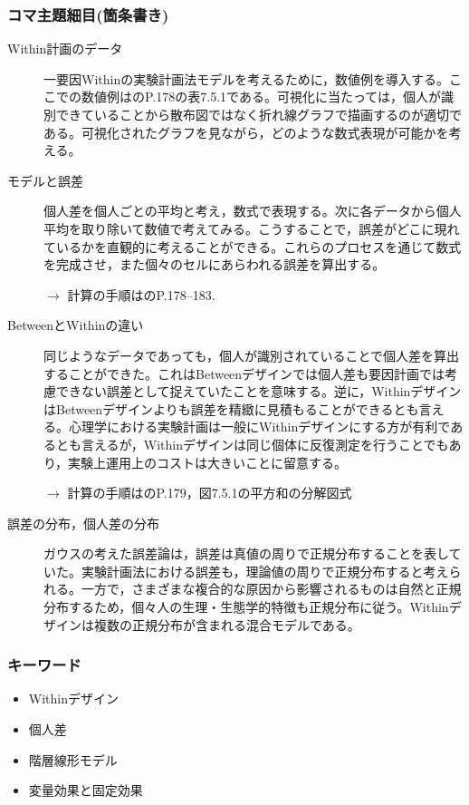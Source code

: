 \subsubsection{コマ主題細目(箇条書き)}
\begin{description}
\item[Within計画のデータ] 一要因Withinの実験計画法モデルを考えるために，数値例を導入する。ここでの数値例は\citet{Yamada2004}のP.178の表7.5.1である。可視化に当たっては，個人が識別できていることから散布図ではなく折れ線グラフで描画するのが適切である。可視化されたグラフを見ながら，どのような数式表現が可能かを考える。

\item[モデルと誤差] 個人差を個人ごとの平均と考え，数式で表現する。次に各データから個人平均を取り除いて数値で考えてみる。こうすることで，誤差がどこに現れているかを直観的に考えることができる。これらのプロセスを通じて数式を完成させ，また個々のセルにあらわれる誤差を算出する。
\begin{flushright}
    $\to$ 計算の手順は\citet{Yamada2004}のP.178--183.
\end{flushright}

\item[BetweenとWithinの違い] 同じようなデータであっても，個人が識別されていることで個人差を算出することができた。これはBetweenデザインでは個人差も要因計画では考慮できない誤差として捉えていたことを意味する。逆に，WithinデザインはBetweenデザインよりも誤差を精緻に見積もることができるとも言える。心理学における実験計画は一般にWithinデザインにする方が有利であるとも言えるが，Withinデザインは同じ個体に反復測定を行うことでもあり，実験上運用上のコストは大きいことに留意する。
\begin{flushright}
    $\to$ 計算の手順は\citet{Yamada2004}のP.179，図7.5.1の平方和の分解図式
\end{flushright}

\item[誤差の分布，個人差の分布] ガウスの考えた誤差論は，誤差は真値の周りで正規分布することを表していた。実験計画法における誤差も，理論値の周りで正規分布すると考えられる。一方で，さまざまな複合的な原因から影響されるものは自然と正規分布するため，個々人の生理・生態学的特徴も正規分布に従う。Withinデザインは複数の正規分布が含まれる混合モデルである。

\end{description}
\subsubsection{キーワード}
\begin{itemize}
\item Withinデザイン
\item 個人差
\item 階層線形モデル
\item 変量効果と固定効果
\end{itemize}
